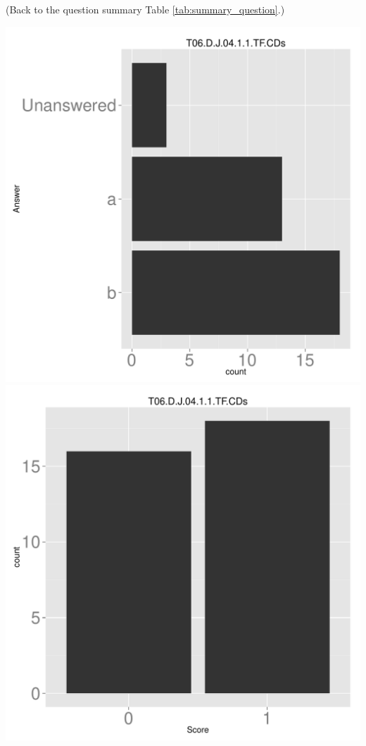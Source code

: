 \documentclass[12pt,nohyper]{tufte-handout}\usepackage[]{graphicx}\usepackage[]{color}
\begin{document}
 (Back to the question summary Table \ref{tab:summary_question}.)

\begin{center} \includegraphics[width=.45\linewidth]{Topic06_26_answer} \includegraphics[width=.45\linewidth]{Topic06_26_score} \end{center} 
\end{document}
